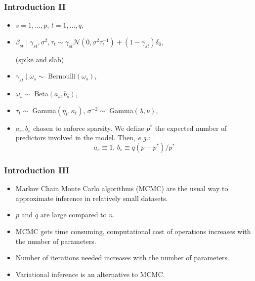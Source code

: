 \documentclass{beamer}
\begin{document}
\begin{frame}
\frametitle{Introduction II}
\begin{itemize}
\item $s = 1,\ldots,p$, $t=1,\ldots,q$,
\item $\beta_{st}\mid\gamma_{st},\sigma^2,\tau_t \sim \gamma_{st}\mathcal{N}(0,\sigma^2\tau_t^{-1})+(1-\gamma_{st})\delta_0$,

(spike and slab)

\item $\gamma_{st} \mid \omega_{s} \sim $ Bernoulli$(\omega_s)$,

\item $\omega_s \sim $ Beta$(a_s,b_s)$,
\item $\tau_t \sim $ Gamma$(\eta_t,\kappa_t)$, $\sigma^{-2} \sim $ Gamma$(\lambda,\nu)$,
\item $a_s, b_s$ chosen to enforce sparsity. We define $p^*$ the expected number of predictors involved in the model. Then, \textit{e.g.}:
$$
a_s \equiv 1\text{, }b_s \equiv q(p-p^*)/p^*
$$

\end{itemize}

\end{frame}

\begin{frame}
\frametitle{Introduction III}
\begin{itemize}
\item Markov Chain Monte Carlo algorithms (MCMC) are the usual way to approximate inference in relatively small datasets.
\item $p$ and $q$ are large compared to $n$.
\item MCMC gets time consuming, computational cost of operations increases with the number of parameters.
\item Number of iterations needed increases with the number of parameters.
\item Variational inference is an alternative to MCMC. 
\end{itemize}
\end{frame}
\end{document}
